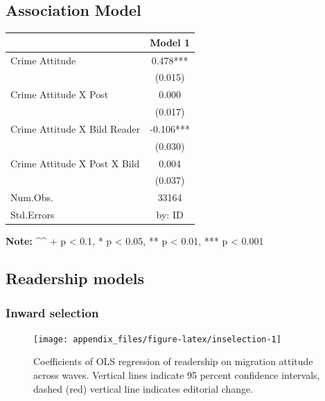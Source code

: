\documentclass[
]{article}
\begin{document}
\pagebreak

\hypertarget{association-model}{%
\subsection{Association Model}\label{association-model}}

\begin{longtable}[]{@{}lc@{}}
\toprule
& Model 1 \\
\midrule
\endhead
Crime Attitude & 0.478*** \\
& (0.015) \\
Crime Attitude X Post & 0.000 \\
& (0.017) \\
Crime Attitude X Bild Reader & -0.106*** \\
& (0.030) \\
Crime Attitude X Post X Bild & 0.004 \\
& (0.037) \\
Num.Obs. & 33164 \\
Std.Errors & by: ID \\
\bottomrule
\end{longtable}

\textbf{Note:}
\^{}\^{} + p \textless{} 0.1, * p \textless{} 0.05, ** p \textless{} 0.01, *** p \textless{} 0.001

\pagebreak

\hypertarget{readership-models}{%
\subsection{Readership models}\label{readership-models}}

\hypertarget{inward-selection}{%
\subsubsection{Inward selection}\label{inward-selection}}

\begin{figure}[!htp]

{\centering \texttt{[image: appendix\_files/figure-latex/inselection-1]} 

}

\caption{Coefficients of OLS regression of readership on migration attitude across waves. Vertical lines indicate 95 percent confidence intervals, dashed (red) vertical line indicates editorial change.}\label{fig:inselection}
\end{figure}
\end{document}
